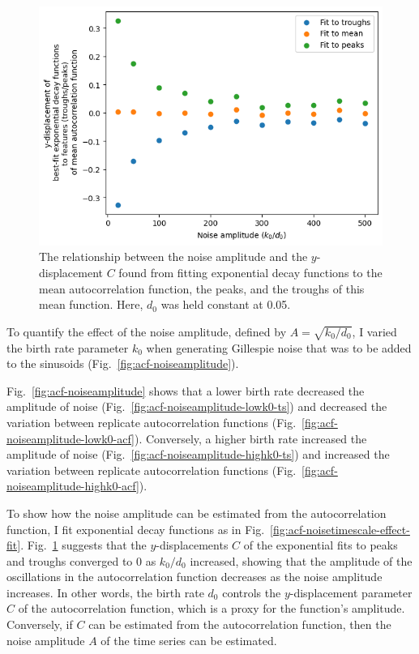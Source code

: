 \begin{figure}
  \centering
  \includegraphics[width=0.6\linewidth]{birthrate_vs_ydispl.png}
  \caption[
    Quantifying the effect of Gillespie noise amplitude on the autocorrelation function
  ]{
    The relationship between the noise amplitude and the $y$-displacement $C$ found from fitting exponential decay functions to the mean autocorrelation function, the peaks, and the troughs of this mean function.
    Here, $d_{0}$ was held constant at 0.05.
  }
  \label{fig:acf-noiseamplitude-effect}
\end{figure}


To quantify the effect of the noise amplitude, defined by $A = \sqrt{k_{0}/d_{0}}$, I varied the birth rate parameter $k_{0}$ when generating Gillespie noise that was to be added to the sinusoids (Fig.\ \ref{fig:acf-noiseamplitude}).

Fig.\ \ref{fig:acf-noiseamplitude} shows that a lower birth rate decreased the amplitude of noise (Fig.\ \ref{fig:acf-noiseamplitude-lowk0-ts}) and decreased the variation between replicate autocorrelation functions (Fig.\ \ref{fig:acf-noiseamplitude-lowk0-acf}).
Conversely, a higher birth rate increased the amplitude of noise (Fig.\ \ref{fig:acf-noiseamplitude-highk0-ts}) and increased the variation between replicate autocorrelation functions (Fig.\ \ref{fig:acf-noiseamplitude-highk0-acf}).

To show how the noise amplitude can be estimated from the autocorrelation function, I fit exponential decay functions as in Fig.\ \ref{fig:acf-noisetimescale-effect-fit}.
Fig.\ \ref{fig:acf-noiseamplitude-effect} suggests that the $y$-displacements $C$ of the exponential fits to peaks and troughs converged to 0 as $k_{0}/d_{0}$ increased, showing that the amplitude of the oscillations in the autocorrelation function decreases as the noise amplitude increases.
In other words, the birth rate $d_{0}$ controls the $y$-displacement parameter $C$ of the autocorrelation function, which is a proxy for the function's amplitude.
Conversely, if $C$ can be estimated from the autocorrelation function, then the noise amplitude $A$ of the time series can be estimated.

